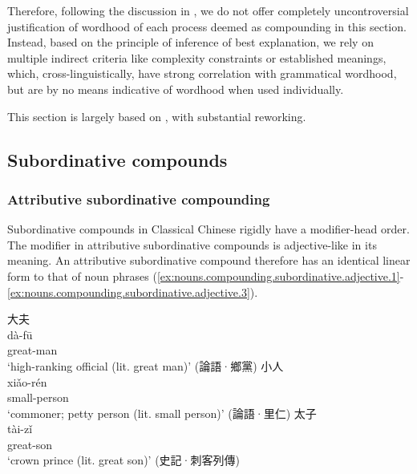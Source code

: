 \documentclass[UTF8, a4paper, oneside, scheme=plain, 12pt]{ctexrep}
\newcommand*{\citesec}[1]{\S~{#1}}
\newcommand{\translate}[1]{`#1'}
\begin{document}
Therefore, following the discussion in ,
we do not offer completely uncontroversial justification of wordhood of each process deemed as compounding in this section.
Instead, based on the principle of inference of best explanation,
we rely on multiple indirect criteria like complexity constraints or established meanings, which, cross-linguistically, have strong correlation with grammatical wordhood, but are by no means indicative of wordhood when used individually.

This section is largely based on \citet[\citesec{0.1.2}]{unger2019grammar},
with substantial reworking.

\subsection{Subordinative compounds}

\subsubsection{Attributive subordinative compounding}

Subordinative compounds in Classical Chinese rigidly have a modifier-head order.
The modifier in attributive subordinative compounds is adjective-like in its meaning.
An attributive subordinative compound therefore has an identical linear form to that of noun phrases 
(\ref{ex:nouns.compounding.subordinative.adjective.1}-\ref{ex:nouns.compounding.subordinative.adjective.3}).

\begin{exe}
    \ex\label{ex:nouns.compounding.subordinative.adjective.1}
    \glll 大夫 \\
    dà-fū \\
    great-man \\
    \glt\translate{high-ranking official (lit. great man)} \hfill (論語·鄉黨)
    \ex\label{ex:nouns.compounding.subordinative.adjective.2}
    \glll 小人 \\
    xiǎo-rén \\
    small-person \\
    \glt\translate{commoner; petty person (lit. small person)} \hfill (論語·里仁)
    \ex\label{ex:nouns.compounding.subordinative.adjective.3}
    \glll 太子 \\
    tài-zǐ \\
    great-son \\
    \glt\translate{crown prince (lit. great son)} \hfill (史記·刺客列傳)
\end{exe}
\end{document}
